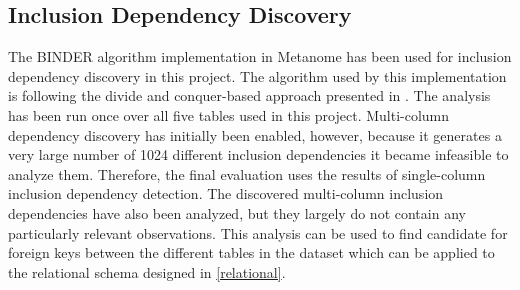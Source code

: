 
\subsection{Inclusion Dependency Discovery} \label{inc}

The BINDER algorithm implementation in Metanome has been used for inclusion dependency discovery in this project. The algorithm used by this implementation is following the divide and conquer-based approach presented in \cite{papenbrock2015divide}. The analysis has been run once over all five tables used in this project. Multi-column dependency discovery has initially been enabled, however, because it generates a very large number of 1024 different inclusion dependencies it became infeasible to analyze them. Therefore, the final evaluation uses the results of single-column inclusion dependency detection. The discovered multi-column inclusion dependencies have also been analyzed, but they largely do not contain any particularly relevant observations. This analysis can be used to find candidate for foreign keys between the different tables in the dataset which can be applied to the relational schema designed in \cref{relational}.

